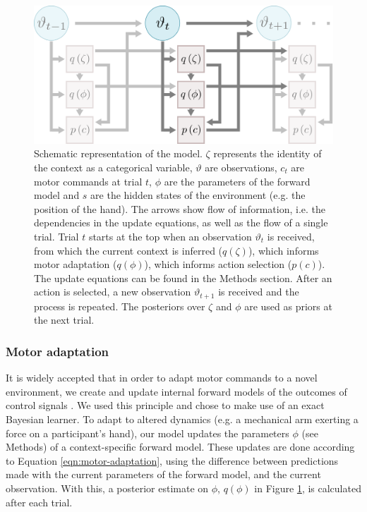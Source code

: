 \documentclass[a4paper,doc,floatsintext,natbib]{apa6}%
\def \fref #1{Figure \ref{#1}}     %
\def \eref #1{Equation \ref{#1}}   %
\begin{document}
\begin{figure}
\centering
\includegraphics[]{./figures/figure_1.png}
\caption{Schematic representation of the model. $\zeta$ represents the identity of the context as a categorical variable, $\vartheta$ are observations, $c_t$ are motor commands at trial $t$, $\phi$ are the parameters of the forward model and $s$ are the hidden states of the environment (e.g. the position of the hand). The arrows show flow of information, i.e. the dependencies in the update equations, as well as the flow of a single trial. Trial $t$ starts at the top when an observation $\vartheta_t$ is received, from which the current context is inferred ($q(\zeta)$), which informs motor adaptation ($q(\phi)$), which informs action selection ($p(c)$). The update equations can be found in the Methods section. After an action is selected, a new observation $\vartheta_{t+1}$ is received and the process is repeated. The posteriors over $\zeta$ and $\phi$ are used as priors at the next trial.}
\label{fig:model}
\end{figure}

\subsubsection{Motor adaptation}
It is widely accepted that in order to adapt motor commands to a novel environment, we create and update internal forward models of the outcomes of control signals \citep{Wolpert_Multiple_1998}. We used this principle and chose to make use of an exact Bayesian learner. To adapt to altered dynamics (e.g. a mechanical arm exerting a force on a participant's hand), our model updates the parameters $\phi$ (see Methods) of a context-specific forward model. These updates are done according to \eref{eqn:motor-adaptation}, using the difference between predictions made with the current parameters of the forward model, and the current observation. With this, a posterior estimate on $\phi$, $q(\phi)$ in \fref{fig:model}, is calculated after each trial.
\end{document}
